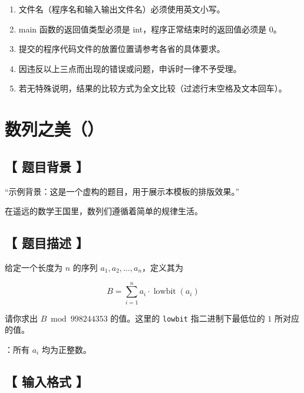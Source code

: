 \documentclass{statement}
\begin{document}
\begin{titlepage}
{\noindent\hspace*{1.5em}}\par
\begin{enumerate}
    \item 文件名（程序名和输入输出文件名）必须使用英文小写。
    \item main 函数的返回值类型必须是 int，程序正常结束时的返回值必须是 0。
    \item 提交的程序代码文件的放置位置请参考各省的具体要求。
    \item 因违反以上三点而出现的错误或问题，申诉时一律不予受理。
    \item 若无特殊说明，结果的比较方式为全文比较（过滤行末空格及文本回车）。
\end{enumerate}
\end{titlepage}

\setcounter{page}{2}

\newpage

\section{ 数列之美（）}

\subsection[ 题目背景 ]{【 题目背景 】}

\begin{callout}
“示例背景：这是一个虚构的题目，用于展示本模板的排版效果。”
\end{callout}

在遥远的数学王国里，数列们遵循着简单的规律生活。


\subsection[ 题目描述 ]{【 题目描述 】}

给定一个长度为 $n$ 的序列 $a_1, a_2, \ldots, a_n$，定义其为

$$B = \sum_{i=1}^{n} a_i \cdot \operatorname{lowbit}(a_i)$$

请你求出 $B \bmod 998244353$ 的值。这里的 \texttt{lowbit} 指二进制下最低位的 $1$ 所对应的值。

：所有 $a_i$ 均为正整数。


\subsection[ 输入格式 ]{【 输入格式 】}
\end{document}
